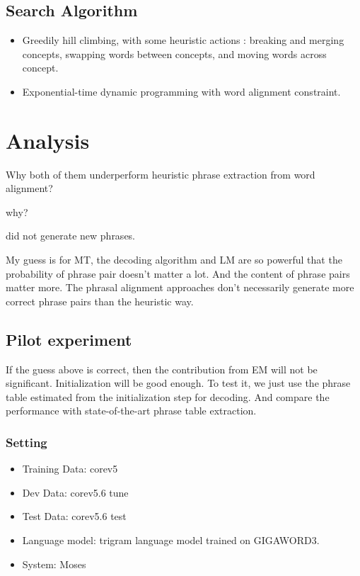 \documentclass[11pt, letterpaper]{article}   	%
\begin{document}
\subsection{Search Algorithm}
\begin{itemize}
\item Greedily hill climbing, with some heuristic actions : breaking and merging concepts, swapping words between concepts, and moving words across concept. \cite{marcu-wong-02}
\item Exponential-time dynamic programming with word alignment constraint.  \cite{denero-06-wmt}
\end{itemize}

\section{Analysis}
Why both of them underperform heuristic phrase extraction from word alignment?

\cite{marcu-wong-02} why?

\cite{denero-06-wmt} did not generate new phrases.

My guess is for MT, the decoding algorithm and LM are so powerful that the probability of phrase pair doesn't matter a lot. And the content of phrase pairs matter more. The phrasal alignment approaches don't necessarily generate more correct phrase pairs than the heuristic way.

\subsection{Pilot experiment}
If the guess above is correct, then the contribution from EM will not be significant. Initialization will be good enough. To test it, we just use the phrase table estimated from the initialization step for decoding. And compare the performance with state-of-the-art phrase table extraction. 

\subsubsection{Setting}
\begin{itemize}
\item Training Data: corev5
\item Dev Data: corev5.6 tune
\item Test Data: corev5.6 test
\item Language model: trigram language model trained on GIGAWORD3.
\item System: Moses \cite{moses-07}
\end{itemize}
\end{document}
